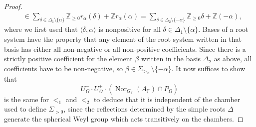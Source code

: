 \documentclass[12pt]{amsart}
\newcommand{\F}{\mathbb{F} }
\numberwithin{equation}{section}
\theoremstyle{remark} %
\begin{document}
\begin{proof}
\begin{align*}
				& \in \sum_{\delta \in \Delta_1\setminus \{\alpha\}} \mathbb{Z}_{\geq 0} r_\alpha(\delta) + \mathbb{Z} r_\alpha(\alpha) = \sum_{\delta \in \Delta_2\setminus \{-\alpha \}} \mathbb{Z}_{\geq 0} \delta + \mathbb{Z} (-\alpha) ,
			\end{align*}
			where we first used that $\langle \delta, \alpha \rangle$ is nonpositive for all $\delta \in \Delta_1 \setminus \{\alpha\}$. Bases of a root system have the property that any element of the root system written in that basis has either all non-negative or all non-positive coefficients. Since there is a strictly positive coefficient for the element $\beta$ written in the basis $\Delta_2$ as above, all coefficients have to be non-negative, so $\beta \in \Sigma_{>_20} \setminus \{-\alpha\}$.  %
			It now suffices to show that 
			$$
			U_\Omega^- \cdot U_\Omega^+ \cdot(\operatorname{Nor}_{G_\F}(A_\F)\cap P_{\Omega})
			$$ is the same for $<_1$ and $<_2$ to deduce that it is independent of the chamber used to define $\Sigma_{>0}$, since the reflections determined by the simple roots $\Delta$ generate the spherical Weyl group which acts transitively on the chambers.
			

\end{proof}
\end{document}

